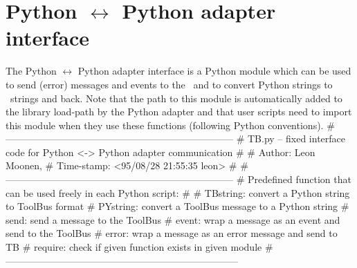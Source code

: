 
\section{\label{TB.py}Python $\leftrightarrow$ Python adapter
interface}

The Python $\leftrightarrow$ Python adapter interface is a Python
module which can be used to send (error) messages and events to the
\TB\ and to convert Python strings to \TB\ strings and back. Note that
the path to this module is automatically added to the library load-path
by the Python adapter and that user scripts need to import this
module when they use these functions (following Python conventions).
\endmoddef\let\nwnotused=\nwoutput{}\nwstartdeflinemarkup{}\nwenddeflinemarkup
# -----------------------------------------------------------------------
# TB.py -- fixed interface code for Python <-> Python adapter communication
#
# Author:       Leon Moonen,
# Time-stamp:   <95/08/28 21:55:35 leon>
#
# -----------------------------------------------------------------------
# Predefined function that can be used freely in each Python script:
#
# TBstring:    convert a Python string to ToolBus format
# PYstring:    convert a ToolBus message to a Python string
# send:        send a message to the ToolBus
# event:       wrap a message as an event and send to the ToolBus
# error:       wrap a message as an error message and send to TB
# require:     check if given function exists in given module
#------------------------------------------------------------------------

